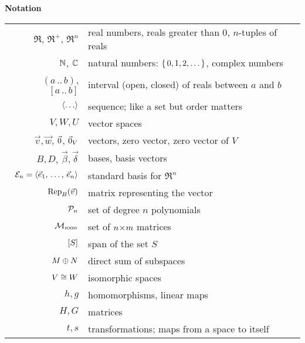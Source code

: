 %

%
%
\thispagestyle{empty}
\begin{center}
  \textbf{Notation}  \\[2ex]
  \begin{tabular}{r|l}
    \( \Re \), \( \Re^+ \), \( \Re^n \) &real numbers, reals greater than $0$, $n$-tuples of reals \\
    \( \N              \),
    \( \C              \)  &natural numbers: \( \set{0,1,2,\ldots} \), complex numbers                           \\
    \( (a\,..\,b) \), \( [a\,..\,b] \) &interval (open, closed) of reals between $a$ and $b$  \\
    \( \sequence{\ldots} \)&sequence; like a set but order matters    \\
    \( V,W,U \)            &vector spaces                             \\
    \( \vec{v},\vec{w} \),
    $\zero$, $\zero_V$     &vectors, zero vector, zero vector of $V$   \\
    \( B,D \), \( \vec{\beta},\vec{\delta} \)         
                          &bases, basis vectors                      \\
    \( \stdbasis_n=\sequence{\vec{e}_1,\,\ldots,\,\vec{e}_n} \)      
                          &standard basis for $\Re^n$                \\
    \( \rep{\vec{v}}{B} \) &matrix representing the vector            \\
    \( \polyspace_n \)     &set of degree \( n \) polynomials      \\
    \( \matspace_{\nbym{n}{m}} \)  &set of \( \nbym{n}{m} \) matrices    \\
    \( \spanof{S} \)       &span of the set \( S \)                   \\
    \( M\directsum N \)    &direct sum of subspaces                   \\
    \( V\isomorphicto W \) &isomorphic spaces                         \\
    \( h,g \)              &homomorphisms, linear maps                \\
    \( H,G \)              &matrices                                  \\
    \( t,s \)              &transformations; maps from a space to itself \\

\end{tabular}
\end{center}
